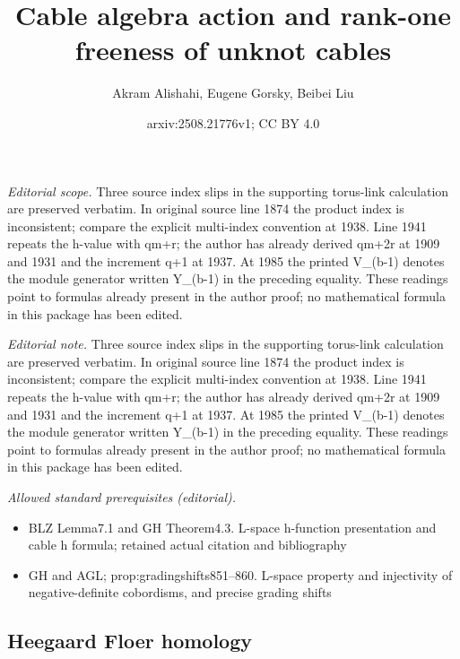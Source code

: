 \documentclass[10pt,a4paper]{amsart}
\title{Cable algebra action and rank-one freeness of unknot cables}
\author{Akram Alishahi, Eugene Gorsky, Beibei Liu}
\date{arxiv:2508.21776v1; CC BY 4.0}
\begin{document}
\maketitle
\noindent\textit{Editorial scope.} Three source index slips in the supporting torus-link calculation are preserved verbatim. In original source line 1874 the product index is inconsistent; compare the explicit multi-index convention at 1938. Line 1941 repeats the h-value with qm+r; the author has already derived qm+2r at 1909 and 1931 and the increment q+1 at 1937. At 1985 the printed V\_(b-1) denotes the module generator written Y\_(b-1) in the preceding equality. These readings point to formulas already present in the author proof; no mathematical formula in this package has been edited.\par\medskip
\noindent\textit{Editorial note.} Three source index slips in the supporting torus-link calculation are preserved verbatim. In original source line 1874 the product index is inconsistent; compare the explicit multi-index convention at 1938. Line 1941 repeats the h-value with qm+r; the author has already derived qm+2r at 1909 and 1931 and the increment q+1 at 1937. At 1985 the printed V\_(b-1) denotes the module generator written Y\_(b-1) in the preceding equality. These readings point to formulas already present in the author proof; no mathematical formula in this package has been edited.\par\medskip
\noindent\textit{Allowed standard prerequisites (editorial).}\begin{itemize}
\item BLZ Lemma7.1 and GH Theorem4.3. L-space h-function presentation and cable h formula; retained actual citation and bibliography
\item GH and AGL; prop:gradingshifts851–860. L-space property and injectivity of negative-definite cobordisms, and precise grading shifts
\end{itemize}\medskip
\subsection{Heegaard Floer homology}
\end{document}
